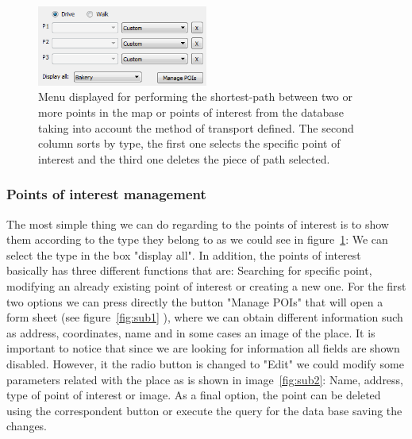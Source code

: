 \documentclass{article}
\begin{document}
\begin{figure}[h]
\centering
\includegraphics[width=0.5\textwidth]{menu_points.png}
\caption{Menu displayed for performing the shortest-path between two or more points in the map or points of interest from the database taking into account the method of transport defined. The second column sorts by type, the first one selects the specific point of interest and the third one deletes the piece of path selected.}
\label{fig:menu_poi}
\end{figure}

\subsubsection{Points of interest management} \label{POI}
The most simple thing we can do regarding to the points of interest is to show them according to the type they belong to as we could see in figure~\ref{fig:menu_poi}: We can select the type in the box "display all". In addition, the points of interest basically has three different functions that are: Searching for specific point, modifying an already existing point of interest or creating a new one. For the first two options we can press directly the button "Manage POIs" that will open a form sheet (see figure~\ref{fig:sub1} ), where we can obtain different information such as address, coordinates, name and in some cases an image of the place. It is important to notice that since we are looking for information all fields are shown disabled. However, it the radio button is changed to "Edit" we could modify some parameters related with the place as is shown in image~\ref{fig:sub2}: Name, address, type of point of interest or image. As a final option, the point can be deleted using the correspondent button or execute the query for the data base saving the changes.
\end{document}
